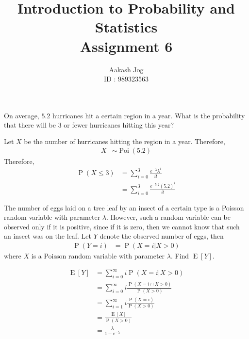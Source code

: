 \documentclass[fleqn, a4paper, 11pt, oneside]{amsart}
\title
[
	Introduction to Probability and Statistics : Assignment 6
]
{
	Introduction to Probability and Statistics\\
	Assignment 6
}
\author
{
	Aakash Jog\\
	ID : 989323563
}
\date{\formatdate{13}{3}{2016}}
\theoremstyle{definition}
\theoremstyle{theorem}
\DeclareMathOperator{\prob}{\mathrm{P}}
\DeclareMathOperator{\expct}{\mathrm{E}}
\DeclareMathOperator{\poi}{\mathrm{Poi}}
\begin{document}
\maketitle

\begin{question}
	On average, $5.2$ hurricanes hit a certain region in a year. What is the probability that there will be $3$ or fewer hurricanes hitting this year?
\end{question}

\begin{solution}
	Let $X$ be the number of hurricanes hitting the region in a year.
	Therefore,
	\begin{align*}
		X &\sim \poi(5.2)
	\end{align*}
	Therefore,
	\begin{align*}
		\prob(X \le 3) &= \sum\limits_{i = 0}^{3} \frac{e^{-\lambda} \lambda^i}{i!}\\
		&= \sum\limits_{i = 0}^{3} \frac{e^{-5.2} (5.2)^i}{i!}
	\end{align*}
\end{solution}

\begin{question}
	The number of eggs laid on a tree leaf by an insect of a certain type is a Poisson random variable with parameter $\lambda$.
	However, such a random variable can be observed only if it is positive, since if it is zero, then we cannot know that such an insect was on the leaf.
	Let $Y$ denote the observed number of eggs, then
	\begin{align*}
		\prob(Y = i) &= \prob(X = i | X > 0)
	\end{align*}
	where $X$ is a Poisson random variable with parameter $\lambda$.
	Find $\expct[Y]$.
\end{question}

\begin{solution}
	\begin{align*}
		\expct[Y] &= \sum\limits_{i = 0}^{\infty} i \prob(X = i|X > 0)\\
		&= \sum\limits_{i = 0}^{\infty} i \frac{\prob(X = i \cap X > 0)}{\prob(X > 0)}\\
		&= \sum\limits_{i = 1}^{\infty} i \frac{\prob(X = i)}{\prob(X > 0)}\\
		&= \frac{\expct[X]}{\prob(X > 0)}\\
		&= \frac{\lambda}{1 - e^{-\lambda}}
	\end{align*}
\end{solution}
\end{document}
